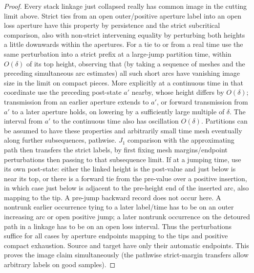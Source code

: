 \begin{proof}
Every stack linkage just collapsed really has common image in the cutting limit above.
Strict ties from an open outer/positive aperture label into an open loss aperture have this property by persistence and the strict subcritical comparison, also with non-strict intervening equality by perturbing both heights a little downwards within the apertures.
For a tie to or from a real time use the same perturbation into a strict prefix at a large-jump partition time, within \(O(\delta)\) of its top height, observing that (by taking a sequence of meshes and the preceding simultaneous arc estimates) all such short arcs have vanishing image size in the limit on compact pieces.
More explicitly at a continuous time in that coordinate use the preceding post-state \(a'\) nearby, whose height differs by \(O(\delta)\); transmission from an earlier aperture extends to \(a'\), or forward transmission from \(a'\) to a later aperture holds, on lowering by a sufficiently large multiple of \(\delta\).
The interval from \(a'\) to the continuous time also has oscillation \(O(\delta)\).
Partitions can be assumed to have these properties and arbitrarily small time mesh eventually along further subsequences, pathwise. \(J_1\) comparison with the approximating path then transfers the strict labels, by first fixing mesh margins/endpoint perturbations then passing to that subsequence limit.
If at a jumping time, use its own post-state: either the linked height is the post-value and just below is near its top, or there is a forward tie from the pre-value over a positive insertion, in which case just below is adjacent to the pre-height end of the inserted arc, also mapping to the tip. A pre-jump backward record does not occur here. A nontrunk earlier occurrence tying to a later label/time has to be on an outer increasing arc or open positive jump; a later nontrunk occurrence on the detoured path in a linkage has to be on an open loss interval.
Thus the perturbations suffice for all cases by aperture endpoints mapping to the tips and positive compact exhaustion.
Source and target have only their automatic endpoints.
This proves the image claim simultaneously (the pathwise strict-margin transfers allow arbitrary labels on good samples).



\end{proof}
